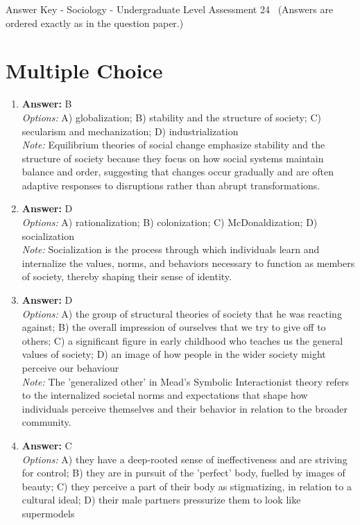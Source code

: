 \documentclass[12pt]{article}
\begin{document}
\begin{center}
Answer Key - Sociology - Undergraduate Level Assessment 24 \
\small (Answers are ordered exactly as in the question paper.)
\end{center}

\section*{Multiple Choice}
\begin{enumerate}[label=\arabic*.]
\item \textbf{Answer:} B
\\ \textit{Options:} A) globalization; B) stability and the structure of society; C) secularism and mechanization; D) industrialization
\\ \textit{Note:} Equilibrium theories of social change emphasize stability and the structure of society because they focus on how social systems maintain balance and order, suggesting that changes occur gradually and are often adaptive responses to disruptions rather than abrupt transformations.
\item \textbf{Answer:} D
\\ \textit{Options:} A) rationalization; B) colonization; C) McDonaldization; D) socialization
\\ \textit{Note:} Socialization is the process through which individuals learn and internalize the values, norms, and behaviors necessary to function as members of society, thereby shaping their sense of identity.
\item \textbf{Answer:} D
\\ \textit{Options:} A) the group of structural theories of society that he was reacting against; B) the overall impression of ourselves that we try to give off to others; C) a significant figure in early childhood who teaches us the general values of society; D) an image of how people in the wider society might perceive our behaviour
\\ \textit{Note:} The 'generalized other' in Mead's Symbolic Interactionist theory refers to the internalized societal norms and expectations that shape how individuals perceive themselves and their behavior in relation to the broader community.
\item \textbf{Answer:} C
\\ \textit{Options:} A) they have a deep-rooted sense of ineffectiveness and are striving for control; B) they are in pursuit of the 'perfect' body, fuelled by images of beauty; C) they perceive a part of their body as stigmatizing, in relation to a cultural ideal; D) their male partners pressurize them to look like supermodels

\end{enumerate}
\end{document}
